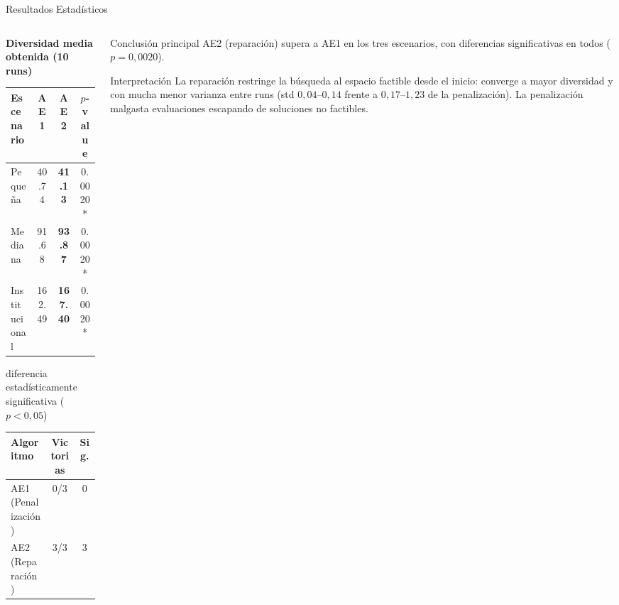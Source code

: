 \documentclass[aspectratio=169]{beamer}
\begin{document}
\begin{frame}{Resultados Estadísticos}
  \begin{columns}[T]
    \begin{column}{0.48\textwidth}
      \textbf{Diversidad media obtenida (10 runs)}\\[4pt]
      \begin{tabular}{lccc}
        \toprule
        Escenario & AE1 & AE2 & $p$-value \\
        \midrule
        Pequeña       & 40.74 & \textbf{41.13} & 0.0020* \\
        Mediana       & 91.68 & \textbf{93.87} & 0.0020* \\
        Institucional & 162.49 & \textbf{167.40} & 0.0020* \\
        \bottomrule
      \end{tabular}
      {\footnotesize * diferencia estadísticamente significativa ($p<0{,}05$)}

      \vspace{8pt}
      \begin{tabular}{lcc}
        \toprule
        Algoritmo & Victorias & Sig.\ \\
        \midrule
        AE1 (Penalización) & 0/3 & 0 \\
        AE2 (Reparación)   & 3/3 & 3 \\
        \bottomrule
      \end{tabular}
    \end{column}
    \begin{column}{0.48\textwidth}
      \begin{alertblock}{Conclusión principal}
        AE2 (reparación) supera a AE1 en los tres escenarios,
        con diferencias significativas en todos ($p=0{,}0020$).
      \end{alertblock}
      \begin{block}{Interpretación}
        La reparación restringe la búsqueda al espacio factible
        desde el inicio: converge a mayor diversidad y con mucha
        menor varianza entre runs (std $0{,}04$--$0{,}14$ frente a
        $0{,}17$--$1{,}23$ de la penalización). La penalización
        malgasta evaluaciones escapando de soluciones no factibles.
      \end{block}
    \end{column}
  \end{columns}
\end{frame}
\end{document}
